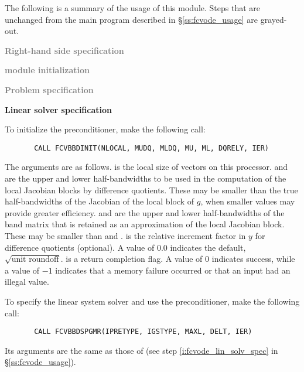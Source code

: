 The following is a summary of the usage of this module. Steps that are unchanged
from the main program described in \S\ref{ss:fcvode_usage} are grayed-out.

\begin{Steps}
  
\item \textcolor{gray}{\bf Right-hand side specification}

\item \textcolor{gray}{\bf {\nvector} module initialization}

\item \textcolor{gray}{\bf Problem specification}

\item {\bf Linear solver specification}

  To initialize the {\cvbbdpre} preconditioner, make the following call:
\begin{verbatim}
       CALL FCVBBDINIT(NLOCAL, MUDQ, MLDQ, MU, ML, DQRELY, IER)
\end{verbatim}
  The arguments are as follows.
   is the local size of vectors on this processor.
   and  are the upper and lower half-bandwidths to be used in 
  the computation of the local Jacobian blocks by difference quotients.
  These may be smaller than the true half-bandwidths of the
  Jacobian of the local block of $g$, when smaller values may
  provide greater efficiency.
   and  are the upper and lower half-bandwidths of the band matrix
  that  is retained as an approximation of the local Jacobian block.
  These may be smaller than  and .
   is the relative increment factor in $y$ for difference quotients
  (optional).  A value of $0.0$ indicates the default, $\sqrt{\text{unit roundoff}}$.
   is a return completion flag.  A value of $0$ indicates success, while
  a value of $-1$ indicates that a memory failure occurred or that an input had
  an illegal value.
  
  To specify the {\spgmr} linear system solver and use the {\cvbbdpre}
  preconditioner, make the following call:
\begin{verbatim}
       CALL FCVBBDSPGMR(IPRETYPE, IGSTYPE, MAXL, DELT, IER)
\end{verbatim}
  Its arguments are the same as those of 
  (see step \ref{i:fcvode_lin_solv_spec} in \S\ref{ss:fcvode_usage}).
  

\end{Steps}
